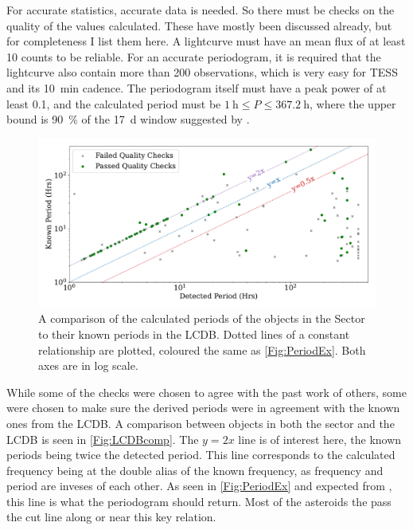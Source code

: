 \documentclass{UCreport}
\begin{document}
For accurate statistics, accurate data is needed. 
So there must be checks on the quality of the values calculated. 
These have mostly been discussed already, but for completeness I list them here.
A lightcurve must have an mean flux of at least 10 counts to be reliable.
For an accurate periodogram, it is required that the lightcurve also contain more than 200 observations, which is very easy for TESS and its \qty{10}{\minute} cadence.
The periodogram itself must have a peak power of at least 0.1, and the calculated period must be $\qty{1}{\hour}\leq P \leq \qty{367.2}{\hour}$, where the upper bound is \qty{90}{\percent} of the \qty{17}{\day} window suggested by \cite{McNeill2023}.  
\begin{figure}[t]
  \centering
  \includegraphics[width=\textwidth]{../OzData/LCBDcompLogScaleLineText1.pdf}
  \caption[Known against calculated period]{A comparison of the calculated periods of the objects in the Sector to their known periods in the LCDB. 
  Dotted lines of a constant relationship are plotted, coloured the same as \autoref{Fig:PeriodEx}.
  Both axes are in log scale.
  }

  \label{Fig:LCDBcomp}
\end{figure}
While some of the checks were chosen to agree with the past work of others, some were chosen to make sure the derived periods were in agreement with the known ones from the LCDB.
A comparison between objects in both the sector and the LCDB is seen in \autoref{Fig:LCDBcomp}. 
The $y=2x$ line is of interest here, the known periods being twice the detected period. 
This line corresponds to the calculated frequency being at the double alias of the known frequency, as frequency and period are inveses of each other. 
As seen in \autoref{Fig:PeriodEx} and expected from \citet{McNeill2023}, this line is what the periodogram should return. 
Most of the asteroids the pass the cut line along or near this key relation. 
\end{document}
